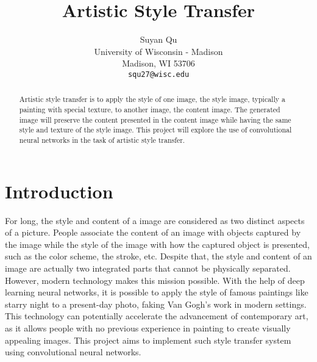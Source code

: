 \documentclass[10pt,twocolumn,letterpaper]{article}
\begin{document}
\title{Artistic Style Transfer}

\author{Suyan Qu\\
University of Wisconsin - Madison\\
Madison, WI 53706\\
{\tt\small squ27@wisc.edu}
}

\maketitle

\begin{abstract}
   Artistic style transfer is to apply the style of one image, the style image, typically a painting with special texture, to another image, the content image. The generated image will preserve the content presented in the content image while having the same style and texture of the style image. This project will explore the use of convolutional neural networks in the task of artistic style transfer. 
\end{abstract}

\section{Introduction}
For long, the style and content of a image are considered as two distinct aspects of a picture. People associate the content of an image with objects captured by the image while the style of the image with how the captured object is presented, such as the color scheme, the stroke, etc. Despite that, the style and content of an image are actually two integrated parts that cannot be physically separated. However, modern technology makes this mission possible. With the help of deep learning neural networks, it is possible to apply the style of famous paintings like starry night to a present-day photo, faking Van Gogh's work in modern settings. This technology can potentially accelerate the advancement of contemporary art, as it allows people with no previous experience in painting to create visually appealing images. This project aims to implement such style transfer system using convolutional neural networks. 

\end{document}
